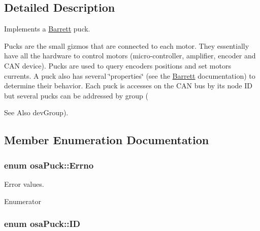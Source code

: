 \subsection{Detailed Description}
Implements a \hyperlink{struct_barrett}{Barrett} puck. 

Pucks are the small gizmos that are connected to each motor. They essentially have all the hardware to control motors (micro-\/controller, amplifier, encoder and C\-A\-N device). Pucks are used to query encoders positions and set motors currents. A puck also has several \char`\"{}properties\char`\"{} (see the \hyperlink{struct_barrett}{Barrett} documentation) to determine their behavior. Each puck is accesses on the C\-A\-N bus by its node I\-D but several pucks can be addressed by group (\begin{DoxySeeAlso}{See Also}
dev\-Group). 
\end{DoxySeeAlso}


\subsection{Member Enumeration Documentation}
\hypertarget{classosa_puck_af19c88d20083577d3a676353b4902391}{
\subsubsection[{Errno}]{\setlength{\rightskip}{0pt plus 5cm}enum {\bf osa\-Puck\-::\-Errno}}}\label{classosa_puck_af19c88d20083577d3a676353b4902391}


Error values. 

\begin{Desc}
\item[Enumerator]\par
\begin{description}
\item[{\em 
\hypertarget{classosa_puck_af19c88d20083577d3a676353b4902391ade248d33c01e1fb3444c3aa6d9e6c1ae}{E\-S\-U\-C\-C\-E\-S\-S}\label{classosa_puck_af19c88d20083577d3a676353b4902391ade248d33c01e1fb3444c3aa6d9e6c1ae}
}]\item[{\em 
\hypertarget{classosa_puck_af19c88d20083577d3a676353b4902391a5aff629d7cc5592d2c7a94b756f6a741}{E\-F\-A\-I\-L\-U\-R\-E}\label{classosa_puck_af19c88d20083577d3a676353b4902391a5aff629d7cc5592d2c7a94b756f6a741}
}]\end{description}
\end{Desc}
\hypertarget{classosa_puck_aa484456bae759574accdc76fe68b4685}{
\subsubsection[{I\-D}]{\setlength{\rightskip}{0pt plus 5cm}enum {\bf osa\-Puck\-::\-I\-D}}}\label{classosa_puck_aa484456bae759574accdc76fe68b4685}


